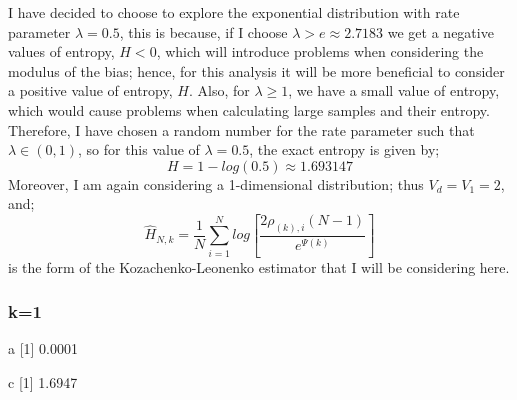 \documentclass{article}
\begin{document}
I have decided to choose to explore the exponential distribution with rate parameter $\lambda = 0.5$, this is because, if I choose $\lambda > e \approx 2.7183$ we get a negative values of entropy, $H < 0$, which will introduce problems when considering the modulus of the bias; hence, for this analysis it will be more beneficial to consider a positive value of entropy, $H$. Also, for $\lambda \geq 1$, we have a small value of entropy, which would cause problems when calculating large samples and their entropy. Therefore, I have chosen a random number for the rate parameter such that $\lambda \in (0, 1)$, so for this value of $\lambda=0.5$, the exact entropy is given by;
\begin{equation} \label{exponential_exact}
H = 1 - log(0.5) \approx 1.693147
\end{equation}
Moreover, I am again considering a 1-dimensional distribution; thus $V_{d} = V_{1} = 2$, and;
\begin{equation}
\hat{H}_{N, k} =  \frac{1}{N} \sum_{i=1}^{N} log \left[ \frac{2\rho_{(k),i}(N-1)}{e^{\Psi(k)}} \right]\nonumber
\end{equation}
is the form of the Kozachenko-Leonenko estimator that I will be considering here.



\subsubsection{k=1} \label{E_k=1}


a
[1] 0.0001

c
[1] 1.6947
\end{document}
